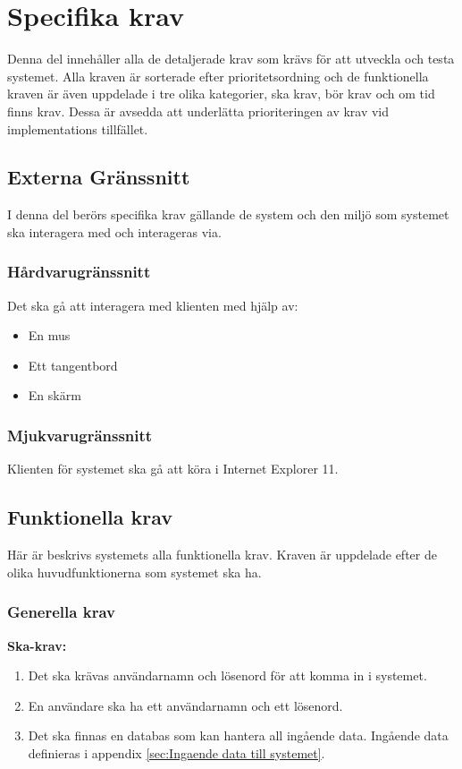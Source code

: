 \documentclass{article}
\begin{document}

\section{Specifika krav}
\label{sec:Specifika krav}
Denna del innehåller alla de detaljerade krav som krävs för att utveckla och
testa systemet. Alla kraven är sorterade efter prioritetsordning och de
funktionella kraven är även
uppdelade i tre olika kategorier, ska krav, bör krav och om tid finns krav.
Dessa är avsedda att underlätta prioriteringen av krav vid implementations
tillfället.

\subsection{Externa Gränssnitt}
\label{subsec:Externa Granssnitt}
I denna del berörs specifika krav gällande de system och den miljö som systemet
ska interagera med och interageras via.

\subsubsection{Hårdvarugränssnitt}
\label{subsec:EG-Hardvarugranssnitt}
Det ska gå att interagera med klienten med hjälp av:
\begin{itemize}
  \item En mus
  \item Ett tangentbord
  \item En skärm
\end{itemize}
\subsubsection{Mjukvarugränssnitt}

\label{subsec:EG-Mjukvarugranssnitt}
Klienten för systemet ska gå att köra i Internet Explorer 11.

\subsection{Funktionella krav}
Här är beskrivs systemets alla funktionella krav. Kraven är uppdelade efter de
olika huvudfunktionerna som systemet ska ha.
\label{subsec:Funktionella krav}
\subsubsection{Generella krav}
\label{subsec:Generella krav}
\textbf{Ska-krav: }
\begin{enumerate}
    \item Det ska krävas användarnamn och lösenord för att komma in i systemet.
    \item En användare ska ha ett användarnamn och ett lösenord.
    \item Det ska finnas en databas som kan hantera all ingående data.
    Ingående data definieras i appendix \ref{sec:Ingaende data till systemet}.
\end{enumerate}
\end{document}
